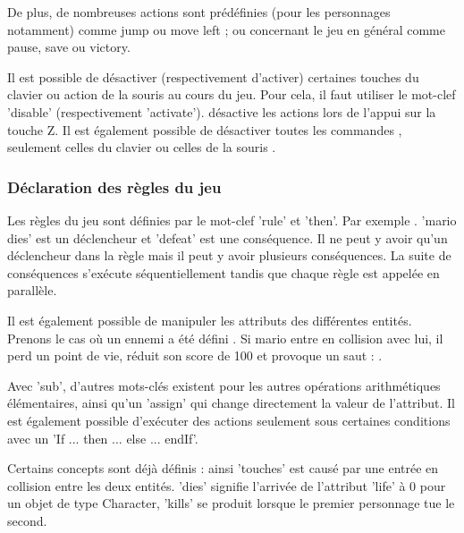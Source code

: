 De plus, de nombreuses actions sont prédéfinies (pour les personnages notamment) comme jump ou move left ; ou concernant le jeu en général comme pause, save ou victory.
 

Il est possible de désactiver (respectivement d'activer) certaines touches du clavier ou action de la souris au cours du jeu.
Pour cela, il faut utiliser le mot-clef 'disable' (respectivement 'activate').
 désactive les actions lors de l'appui sur la touche Z.
Il est également possible de désactiver toutes les commandes , seulement celles du clavier  ou celles de la souris .

\subsubsection{Déclaration des règles du jeu}

Les règles du jeu sont définies par le mot-clef 'rule' et 'then'.
Par exemple .
'mario dies' est un déclencheur et 'defeat' est une conséquence.
Il ne peut y avoir qu'un déclencheur dans la règle mais il peut y avoir plusieurs conséquences.
La suite de conséquences s'exécute séquentiellement tandis que chaque règle est appelée en parallèle.

Il est également possible de manipuler les attributs des différentes entités. Prenons le cas où un ennemi a été défini .
Si mario entre en collision avec lui, il perd un point de vie, réduit son score de 100 et provoque un saut :
 .

Avec 'sub', d'autres mots-clés existent pour les autres opérations arithmétiques élémentaires, ainsi qu'un 'assign' qui change directement
la valeur de l'attribut.
Il est également possible d'exécuter des actions seulement sous certaines conditions avec un 'If ... then ... else ... endIf'.

Certains concepts sont déjà définis : ainsi 'touches' est causé par une entrée en collision entre les deux entités. 'dies' signifie l'arrivée de l'attribut
'life' à 0 pour un objet de type Character, 'kills' se produit lorsque le premier personnage tue le second.

